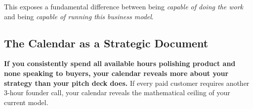 This exposes a fundamental difference between being \textit{capable of doing the work} and being \textit{capable of running this business model}.

\subsection{The Calendar as a Strategic Document}

\textbf{If you consistently spend all available hours polishing product and none speaking to buyers, your calendar reveals more about your strategy than your pitch deck does.} If every paid customer requires another 3-hour founder call, your calendar reveals the mathematical ceiling of your current model.
